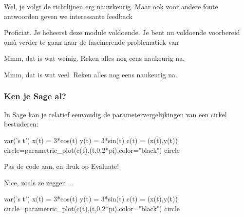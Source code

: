 \documentclass[handout]{ximera}
\begin{document}
\begin{problem}
\begin{question}
 
      
          \begin{feedback}[antw==7]
            Wel, je volgt de richtlijnen erg nauwkeurig. Maar ook voor andere foute antwoorden geven we interessante feedback
          \end{feedback}
          \begin{feedback}[antw==8]
          Proficiat. Je heheerst deze module voldoende. Je bent nu voldoende voorbereid omù verder te gaan naar de fascinerende problematiek van 
          \end{feedback}
          \begin{feedback}[antw<7]
              Mmm, dat is wat weinig. Reken alles nog eens naukeurig na.
            \end{feedback}
          \begin{feedback}[antw>8]
               Mmm, dat is wat veel. Reken alles nog eens naukeurig na.
           \end{feedback}
       \end{question}
\end{problem}

\subsubsection{Ken je Sage al?}

In Sage kan je relatief eenvoudig de parametervergelijkingen van een cirkel bestuderen:

\begin{sageCell}
    var('s t')
    x(t) = 3*cos(t)
    y(t) = 3*sin(t)
    c(t) = (x(t),y(t))
    circle=parametric_plot(c(t),(t,0,2*pi),color="black")
    circle
\end{sageCell}


\begin{onlineOnly}
    
    Pas de code aan, en druk op Evaluate!
    
    Nice, zoals ze zeggen ...
    
\begin{sageOutput}
    var('s t')
    x(t) = 3*cos(t)
    y(t) = 3*sin(t)
    c(t) = (x(t),y(t))
    circle=parametric_plot(c(t),(t,0,2*pi),color="black")
    circle
\end{sageOutput}
\end{onlineOnly}
\end{document}
